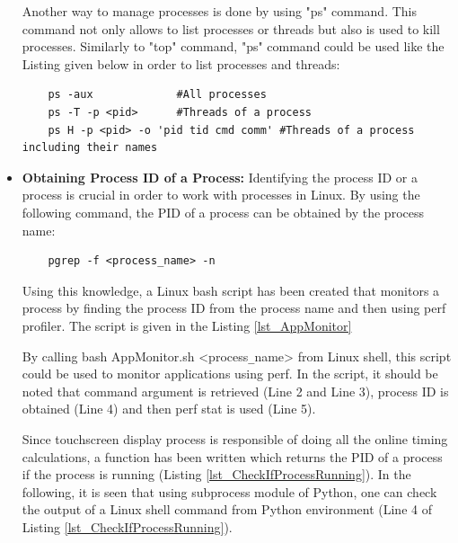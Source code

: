 \begin{itemize}
	Another way to manage processes is done by using "ps" command. This command not only allows to list processes or threads but also is used to kill processes. Similarly to "top" command, "ps" command could be used like the Listing given below in order to list processes and threads:
	\begin{lstlisting}
	ps -aux             #All processes
	ps -T -p <pid>      #Threads of a process
	ps H -p <pid> -o 'pid tid cmd comm' #Threads of a process including their names
	\end{lstlisting}
	
	\item \textbf{Obtaining Process ID of a Process:} Identifying the process ID or a process is crucial in order to work with processes in Linux. By using the following command, the PID of a process can be obtained by the process name:
	\begin{lstlisting}
	pgrep -f <process_name> -n 
	\end{lstlisting}
	Using this knowledge, a Linux bash script has been created that monitors a process by finding the process ID from the process name and then using perf profiler. The script is given in the Listing \ref{lst_AppMonitor}
	
	
	By calling bash AppMonitor.sh <process\texttt{\_}name> from Linux shell, this script could be used to monitor applications using perf. In the script, it should be noted that command argument is retrieved (Line 2 and Line 3), process ID is obtained (Line 4) and then perf stat is used (Line 5). 
	
	
	Since touchscreen display process is responsible of doing all the online timing calculations, a function has been written which returns the PID of a process if the process is running (Listing \ref{lst_CheckIfProcessRunning}). In the following, it is seen that using subprocess module of Python, one can check the output of a Linux shell command from Python environment (Line 4 of Listing \ref{lst_CheckIfProcessRunning}).
	

\end{itemize}
